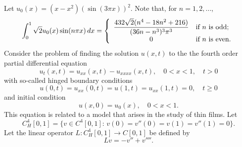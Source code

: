 
Let $u_0(x) = (x-x^2) \left(\sin(3\pi x)\right)^2$. Note that, for $n=1,2,\ldots$,
\[
\int_0^1\sqrt{2}u_0(x)\sin(n\pi x)\,dx =\left\{ \begin{array}{cl} \displaystyle{{432\sqrt{2} (n^4-18n^2 + 216) \over (36n-n^3)^3 \pi^3}} & \mbox{if }n\mbox{ is odd}; \\0 & \mbox{if }n\mbox{ is even}.
\end{array}\right.
\]
Consider the problem of finding the solution $u(x,t)$ to the the fourth order partial differential equation
\[
u_t(x,t) = u_{xx}(x,t) - u_{xxxx}(x,t),\quad 0<x<1,\quad t>0
\]
with so-called hinged boundary conditions
\[
u(0,t) = u_{xx}(0,t) = u(1,t) = u_{xx}(1,t) = 0,\quad t\ge0
\]
and initial condition
\[
u(x,0) = u_0(x),\quad 0<x<1.
\]
This equation is related to a model that arises in the study of thin films. Let
\[
C^4_H[0,1] = \{ v \in C^4[0,1]:\, v(0)=v''(0)=v(1)=v''(1)=0\}.
\]
Let the linear operator $L: C^4_H[0,1] \rightarrow C[0,1]$ be defined by
\[
Lv = -v'' + v''''.
\]
\\
